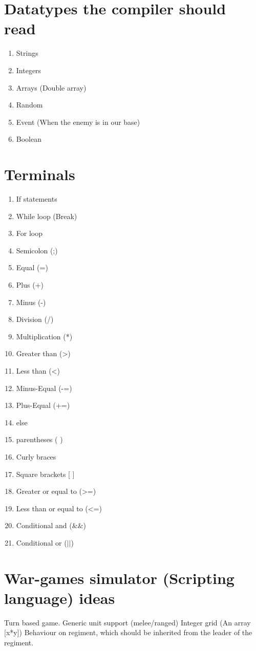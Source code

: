 


\section*{Datatypes the compiler should read}

\begin{enumerate}
	\item Strings
	\item Integers
	\item Arrays (Double array)
	\item Random
	\item Event (When the enemy is in our base)
	\item Boolean
\end{enumerate}


\section*{Terminals}
\begin{enumerate}

	\item If statements
	\item While loop (Break)
	\item For loop	
	\item Semicolon (;)
	\item Equal (=)
	\item Plus (+)
	\item Minus (-)
	\item Division (/)
	\item Multiplication (*)
	\item Greater than (>)
	\item Less than (<)
	\item Minus-Equal (-=)
	\item Plus-Equal (+=)
	\item else 
	\item parentheses ( )
	\item Curly braces { }
	\item Square brackets [ ]
	\item Greater or equal to (>=)
	\item Less than or equal to (<=)
	\item Conditional and ($\&\&$)
	\item Conditional or ($||$)
	
\end{enumerate}

\section*{War-games simulator (Scripting language) ideas}

Turn based game.
Generic unit support (melee/ranged)
Integer grid (An array [x*y])
Behaviour on regiment, which should be inherited from the leader of the regiment.

